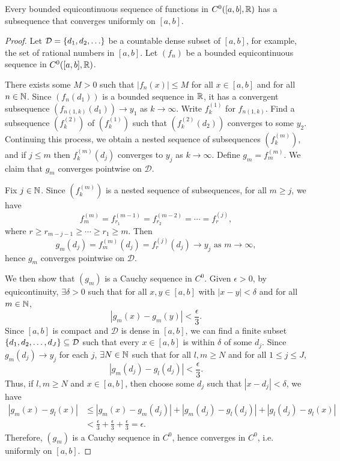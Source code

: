 \begin{thm}
    Every bounded equicontinuous sequence of functions in $C^0([a, b], {\mathbb R})$ has a subsequence that converges uniformly on $[a, b]$.
    \begin{proof}
        Let $\mathcal D = {\left\{{d_1, d_2, \ldots}\right\}}$ be a countable dense subset of $[a, b]$, for example, the set of rational numbers in $[a, b]$. Let $(f_n)$ be a bounded equicontinuous sequence in $C^0([a, b], {\mathbb R})$. 

        There exists some $M > 0$ such that $|f_n(x)| \leq M$ for all $x \in [a, b]$ and for all $n \in {\mathbb N}$. Since $(f_n(d_1))$ is a bounded sequence in ${\mathbb R}$, it has a convergent subsequence $(f_{n(1, k)}(d_1)) \to y_1$ as $k \to \infty$. Write $f_{k}^{(1)}$ for $f_{n(1, k)}$. Find a subsequence $(f_k^{(2)})$ of $(f_k^{(1)})$ such that $(f_k^{(2)}(d_2))$ converges to some $y_2$. Continuing this process, we obtain a nested sequence of subsequences $(f_k^{(m)})$, and if $j \leq m$ then $f_k^{(m)}(d_j)$ converges to $y_j$ as $k \to \infty$. Define $g_m = f_m^{(m)}$. We claim that $g_m$ converges pointwise on $\mathcal D$.

        Fix $j \in {\mathbb N}$. Since $(f_k^{(m)})$ is a nested sequence of subsequences, for all $m \geq j$, we have
        \[
        f_m^{(m)} = f_{r_1}^{(m-1)} = f_{r_2}^{(m-2)} = \cdots = f_{r}^{(j)},
        \]
        where $r \geq r_{m-j-1} \geq \cdots \geq r_1 \geq m$. Then
        \[
        g_m(d_j) = f_m^{(m)}(d_j) = f_r^{(j)}(d_j) \to y_j \text{ as } m \to \infty,
        \]
        hence $g_m$ converges pointwise on $\mathcal D$. 
        
        We then show that $(g_m)$ is a Cauchy sequence in $C^0$. Given $\epsilon > 0$, by equicontinuity, $\exists \delta > 0$ such that for all $x, y \in [a, b]$ with $|x - y| < \delta$ and for all $m \in {\mathbb N}$,
        \[
        |g_m(x) - g_m(y)| < \frac{\epsilon}{3}.
        \]
        Since $[a, b]$ is compact and $\mathcal D$ is dense in $[a, b]$, we can find a finite subset ${\left\{{d_1, d_2, \ldots, d_J}\right\}} \subseteq \mathcal D$ such that every $x \in [a, b]$ is within $\delta$ of some $d_j$. Since $g_m(d_j) \to y_j$ for each $j$, $\exists N \in {\mathbb N}$ such that for all $l, m \geq N$ and for all $1 \leq j \leq J$,
        \[
        |g_m(d_j) - g_l(d_j)| < \frac{\epsilon}{3}.
        \]
        Thus, if $l, m \geq N$ and $x \in [a, b]$, then choose some $d_j$ such that $|x - d_j| < \delta$, we have
        \begin{align*}
            |g_m(x) - g_l(x)| &\leq |g_m(x) - g_m(d_j)| + |g_m(d_j) - g_l(d_j)| + |g_l(d_j) - g_l(x)| \\
            &< \frac{\epsilon}{3} + \frac{\epsilon}{3} + \frac{\epsilon}{3} = \epsilon.
        \end{align*}
        Therefore, $(g_m)$ is a Cauchy sequence in $C^0$, hence converges in $C^0$, i.e. uniformly on $[a, b]$.
    \end{proof}
\end{thm}

